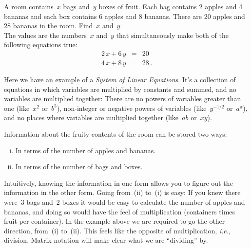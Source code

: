 \begin{example} 
A room contains~$x$ bags and~$y$ boxes of fruit. 
Each bag contains 2 apples and 4 bananas and each box contains 6 apples and 8 bananas. 
There are 20 apples and 28 bananas in the room. Find~$x$ and~$y$.
\\


\noindent
The values are the numbers~$x$ and~$y$ that simultaneously make both of the following equations true:
\begin{eqnarray*}
	2\, x + 6\, y & =  & 20 \\
	4\, x + 8\, y & = & 28\, .
\end{eqnarray*}
\end{example}
Here we have an example of a \emph{System of Linear Equations}.  It's a collection of equations in which variables are multiplied by constants and summed, and no variables are multiplied together:  There are no powers of variables greater than one (like~$x^2$ or~$b^5$), non-integer or negative powers of variables (like~$y^{-1/2}$ or~$a^{\pi}$), and no places where variables are multiplied together (like~$ab$ or~$xy$).

%
\noindent
Information about the fruity contents of the room can be stored two ways: 
\begin{enumerate}[(i)]
\item In terms of the number of apples and bananas. 
\item In terms of the number of bags and boxes. 
\end{enumerate}
Intuitively, knowing the information in one form allows you to figure out the information in the other form. 
Going from~(ii) to~(i) is easy: 
If you knew there were~3 bags and~2 boxes it would be easy to calculate the number of apples and bananas, and doing so would have the feel of multiplication (containers times fruit per container). 
In the example above we are required to go the other direction, from~(i) to~(ii). This  feels like the opposite of multiplication, {\it i.e.}, division. Matrix notation will 
make clear what we are ``dividing'' by. 

